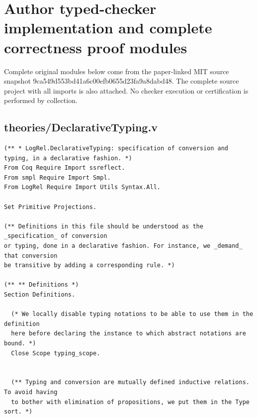\clearpage
\section*{Author typed-checker implementation and complete correctness proof modules}
Complete original modules below come from the paper-linked MIT source snapshot 9ca549d553bd41a6c00efb0655d23fa9a8dabd48. The complete source project with all imports is also attached. No checker execution or certification is performed by collection.

\subsection*{theories/DeclarativeTyping.v}
\begin{lstlisting}
(** * LogRel.DeclarativeTyping: specification of conversion and typing, in a declarative fashion. *)
From Coq Require Import ssreflect.
From smpl Require Import Smpl.
From LogRel Require Import Utils Syntax.All.

Set Primitive Projections.

(** Definitions in this file should be understood as the _specification_ of conversion
or typing, done in a declarative fashion. For instance, we _demand_ that conversion
be transitive by adding a corresponding rule. *)

(** ** Definitions *)
Section Definitions.

  (* We locally disable typing notations to be able to use them in the definition
  here before declaring the instance to which abstract notations are bound. *)
  Close Scope typing_scope.


  (** Typing and conversion are mutually defined inductive relations. To avoid having
  to bother with elimination of propositions, we put them in the Type sort. *)


\end{lstlisting}
